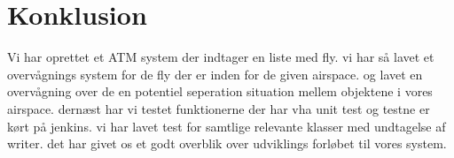 \section{Konklusion}
Vi har oprettet et ATM system der indtager en liste med fly. vi har så lavet et overvågnings system for de fly der er inden for de given airspace. og lavet en overvågning over de en potentiel seperation situation mellem objektene i vores airspace. dernæst har vi testet funktionerne der har vha unit test og testne er kørt på jenkins. vi har lavet test for samtlige relevante klasser med undtagelse af writer. det har givet os et godt overblik over udviklings forløbet til vores system.